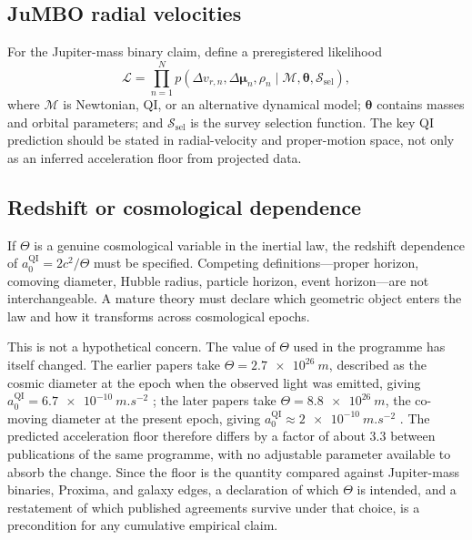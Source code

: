 \documentclass[11pt]{article}
\newcommand{\QI}{\mathrm{QI}}
\begin{document}
\subsection{JuMBO radial velocities}

For the Jupiter-mass binary claim, define a preregistered likelihood
\begin{equation}
    \mathcal L
    =\prod_{n=1}^{N}
    p\left(
    \Delta v_{r,n},\Delta\bm\mu_n,\rho_n
    \mid
    \mathcal M,\bm\theta,\mathcal S_{\mathrm{sel}}
    \right),
    \label{eq:jumbo_likelihood}
\end{equation}
where \(\mathcal M\) is Newtonian, QI, or an alternative dynamical model; \(\bm\theta\) contains masses and orbital parameters; and \(\mathcal S_{\mathrm{sel}}\) is the survey selection function. The key QI prediction should be stated in radial-velocity and proper-motion space, not only as an inferred acceleration floor from projected data.

\subsection{Redshift or cosmological dependence}

If \(\Theta\) is a genuine cosmological variable in the inertial law, the redshift dependence of \(a_{0}^{\QI}=2c^{2}/\Theta\) must be specified. Competing definitions---proper horizon, comoving diameter, Hubble radius, particle horizon, event horizon---are not interchangeable. A mature theory must declare which geometric object enters the law and how it transforms across cosmological epochs.

This is not a hypothetical concern. The value of \(\Theta\) used in the programme has itself changed. The earlier papers take \(\Theta=\SI{2.7e26}{m}\), described as the cosmic diameter at the epoch when the observed light was emitted, giving \(a_{0}^{\QI}=\SI{6.7e-10}{m.s^{-2}}\) \cite{McCulloch2012}; the later papers take \(\Theta=\SI{8.8e26}{m}\), the co-moving diameter at the present epoch, giving \(a_{0}^{\QI}\approx\SI{2e-10}{m.s^{-2}}\) \cite{McCulloch2017Galaxy,McCulloch2026JuMBO}. The predicted acceleration floor therefore differs by a factor of about \(3.3\) between publications of the same programme, with no adjustable parameter available to absorb the change. Since the floor is the quantity compared against Jupiter-mass binaries, Proxima, and galaxy edges, a declaration of which \(\Theta\) is intended, and a restatement of which published agreements survive under that choice, is a precondition for any cumulative empirical claim.
\end{document}
